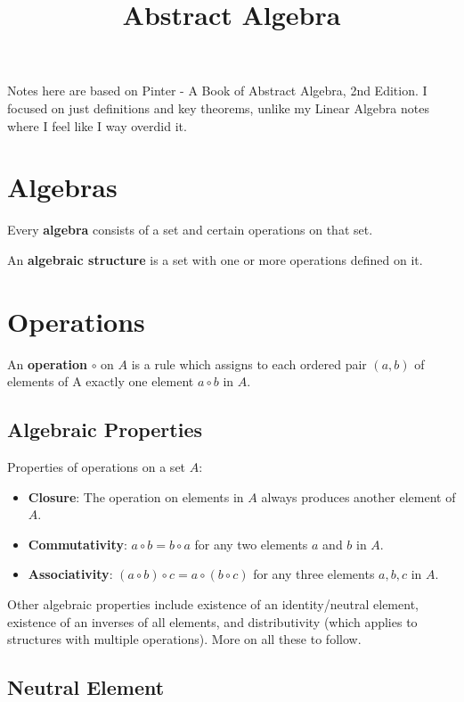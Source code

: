 \documentclass[11pt]{article}
\title{Abstract Algebra}
\begin{document}
\maketitle

Notes here are based on Pinter - A Book of Abstract Algebra, 2nd
Edition. I focused on just definitions and key theorems, unlike my
Linear Algebra notes where I feel like I way overdid it.

\section{Algebras}\label{algebras}

Every \textbf{algebra} consists of a set and certain operations on that
set.

An \textbf{algebraic structure} is a set with one or more operations
defined on it.

\section{Operations}\label{operations}

An \textbf{operation} \(\circ\) on \(A\) is a rule which assigns to each
ordered pair \((a, b)\) of elements of A exactly one element
\(a \circ b\) in \(A\).

\subsection{Algebraic Properties}\label{algebraic-properties}

Properties of operations on a set \(A\):

\begin{itemize}
\tightlist
\item
  \textbf{Closure}: The operation on elements in \(A\) always produces
  another element of \(A\).
\item
  \textbf{Commutativity}: $a \circ b = b \circ a$ for any two
  elements \(a\) and \(b\) in \(A\).
\item
  \textbf{Associativity}: \((a \circ b) \circ c = a \circ (b \circ c)\)
  for any three elements \(a,b,c\) in \(A\).
\end{itemize}

Other algebraic properties include existence of an identity/neutral
element, existence of an inverses of all elements, and distributivity
(which applies to structures with multiple operations). More on all
these to follow.

\subsection{Neutral Element}\label{neutral-element}
\end{document}
